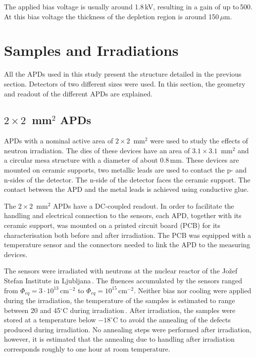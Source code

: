 \documentclass[review,number,sort&compress]{elsarticle}
\begin{document}
The applied bias voltage is usually around 1.8\,kV, resulting in a gain of up to\,500.
At this bias voltage the thickness of the depletion region is around 150\,$\mu$m.


\section{Samples and Irradiations}
\label{sec:samples}

All the APDs used in this study present the structure detailed in the previous section.
Detectors of two different sizes were used.
In this section, the geometry and readout of the different APDs are explained.

\subsection{$2 \times 2$~mm$^2$ APDs}

APDs with a nominal active area of $2 \times 2$~mm$^2$ were used to study the effects of neutron irradiation.
The dies of these devices have an area of $3.1 \times 3.1$~mm$^2$ and a circular mesa structure with a diameter of about 0.8\,mm.
These devices are mounted on ceramic supports, two metallic leads are used to contact the p- and n-sides of the detector.
The n-side of the detector faces the ceramic support.
The contact between the APD and the metal leads is achieved using conductive glue.

The $2 \times 2$~mm$^2$ APDs have a DC-coupled readout.
In order to facilitate the handling and electrical connection to the sensors, each APD, together with its ceramic support, was mounted on a printed circuit board (PCB) for its characterisation both before and after irradiation.
The PCB was equipped with a temperature sensor and the connectors needed to link the APD to the measuring devices.

The sensors were irradiated with neutrons at the nuclear reactor of the Jo\v{z}ef Stefan Institute in Ljubljana\,\cite{jsiIrrad}.
The fluences accumulated by the sensors ranged from $\Phi_{eq} = 3 \cdot 10^{13}$\,cm$^{-2}$ to $\Phi_{eq} = 10^{15}$\,cm$^{-2}$.
Neither bias nor cooling were applied during the irradiation, the temperature of the samples is estimated to range between 20 and 45$^\circ$C during irradiation\,\cite{vlado}.
After irradiation, the samples were stored at a temperature below $-18^\circ$C to avoid the annealing of the defects produced during irradiation.
No annealing steps were performed after irradiation, however, it is estimated that the annealing due to handling after irradiation corresponds roughly to one hour at room temperature.
\end{document}
